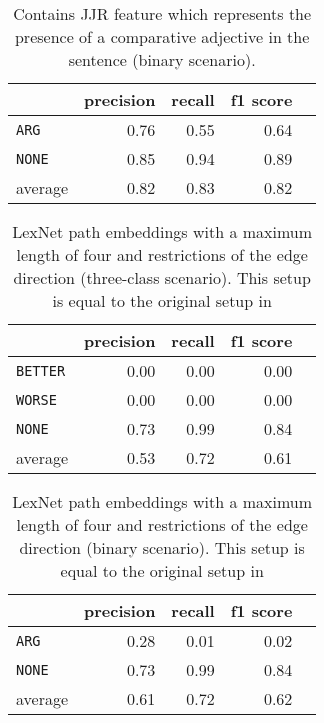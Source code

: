 \begin{table}[h] 
	\centering 
	\caption{Contains JJR feature which represents the presence of a comparative adjective in the sentence (binary scenario).} 
	\begin{tabular}{@{}lrrrr@{}}
		\toprule
		                & precision & recall & f1 score \\ \midrule 
		\texttt{ARG}    & 0.76      & 0.55   & 0.64     \\ 
		\texttt{NONE}   & 0.85      & 0.94   & 0.89     \\ 
		average         & 0.82      & 0.83   & 0.82     \\ 			\bottomrule
	\end{tabular}
\end{table}




\begin{table}[htbp] 
	\centering 
	\caption{LexNet path embeddings with a maximum length of four and restrictions of the edge direction (three-class scenario). This setup is equal to the original setup in \cite{DBLP:journals/corr/ShwartzD16}} 
	\begin{tabular}{@{}lrrrr@{}}
		\toprule
		                & precision & recall & f1 score \\ \midrule 
		\texttt{BETTER} & 0.00      & 0.00   & 0.00     \\ 
		\texttt{WORSE}  & 0.00      & 0.00   & 0.00     \\ 
		\texttt{NONE}   & 0.73      & 0.99   & 0.84     \\ 
		average         & 0.53      & 0.72   & 0.61     \\ 			\bottomrule
	\end{tabular}
\end{table}

\begin{table}[htbp] 
	\centering 
	\caption{LexNet path embeddings with a maximum length of four and restrictions of the edge direction (binary scenario). This setup is equal to the original setup in \cite{DBLP:journals/corr/ShwartzD16}} 
	\begin{tabular}{@{}lrrrr@{}}
		\toprule
		                & precision & recall & f1 score \\ \midrule 
		\texttt{ARG}    & 0.28      & 0.01   & 0.02     \\ 
		\texttt{NONE}   & 0.73      & 0.99   & 0.84     \\ 
		average         & 0.61      & 0.72   & 0.62     \\ 			\bottomrule
	\end{tabular}
\end{table}




